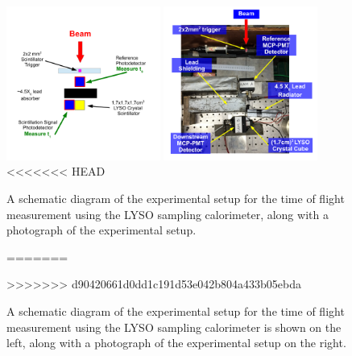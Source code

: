 \documentclass[12pt]{article}
\begin{document}
\begin{figure}[h] \centering
\includegraphics[width=0.45\textwidth]{figs/LYSOSamplingCaloSetupSchematic} 
\includegraphics[width=0.45\textwidth]{figs/LYSOSamplingCaloSetupPhoto} 
<<<<<<< HEAD
\caption{ A schematic diagram of the experimental setup for the
time of flight measurement using the LYSO sampling calorimeter, 
along with a photograph of the experimental setup. } 
=======
\caption{A schematic diagram of the experimental setup for the
time of flight measurement using the LYSO sampling calorimeter
is shown on the left, along with a photograph of the experimental setup on the right. } 
>>>>>>> d90420661d0dd1c191d53e042b804a433b05ebda
\label{fig:LYSOSamplingCaloSetup}
\end{figure}
\end{document}
